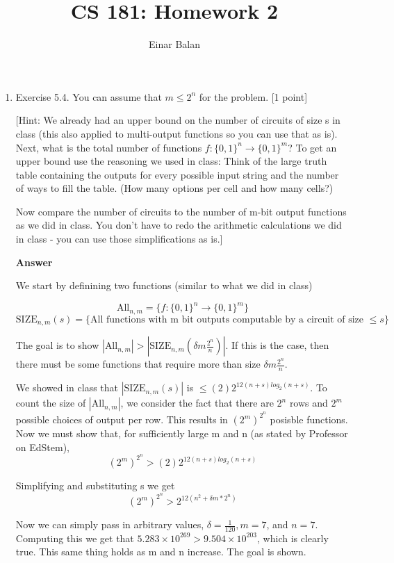 \documentclass[11pt]{article}
\title{\bf{CS 181: Homework 2}}
\author{ Einar Balan}
\date{}
\newcommand \kw[1]{\textbf{#1}}
\newenvironment{answer}{
\vspace{.5cm}
\kw{Answer} 

}
{
\pagebreak
}
\begin{document}
\maketitle



\begin{enumerate}
\item Exercise 5.4. You can assume that $m \leq 2^n$ for the problem. [1 point]

[Hint: We already had an upper bound on the number of circuits of size s in class (this also applied to multi-output functions so you can use that as is). Next, what is the total number of functions $f:\{0,1\}^n \rightarrow \{0,1\}^m$? To get an upper bound use the reasoning we used in class: Think of the large truth table containing the outputs for every possible input string and the number of ways to fill the table. (How many options per cell and how many cells?)

Now compare the number of circuits to the number of m-bit output functions as we did in class. You don't have to redo the arithmetic calculations we did in class - you can use those simplifications as is.]

\begin{answer}
    We start by definining two functions (similar to what we did in class)

    \[
        \text{All}_{n,m} = \{ f: \{0, 1\}^n \rightarrow \{0, 1\}^m \}
    \]
    \[
        \text{SIZE}_{n, m}(s) = \{ \text{All functions with m bit outputs computable by a circuit of size } \le s\}
    \]

    The goal is to show $|\text{All}_{n,m}| > |\text{SIZE}_{n, m}(\delta m \frac{2^n}{n})|$. If this is the case, then there must be some functions that require more than size $\delta m \frac{2^n}{n}$.

    We showed in class that $|\text{SIZE}_{n, m}(s)|$ is $\le (2)2^{12(n + s)log_2(n+s)}$. To count the size of $|\text{All}_{n,m}|$, we consider the fact that there are $2^n$ rows and $2^m$ possible choices of output per row. This results in $(2^m)^{2^n}$ posisble functions. Now we must show that, for sufficiently large m and n (as stated by Professor on EdStem),
    \[
        (2^m)^{2^n} > (2)2^{12(n + s)log_2(n+s)}
    \]  

    Simplifying and substituting s we get 
    \[
        (2^m)^{2^n} > 2^{12(n^2 + \delta m * 2^n)}
    \]

    Now we can simply pass in arbitrary values, $\delta = \frac{1}{120}, m = 7$, and $n = 7$. Computing this we get that $5.283 \times 10^{269} > 9.504 \times 10^{203}$, which is clearly true. This same thing holds as m and n increase. The goal is shown.


\end{answer}
\end{enumerate}
\end{document}
